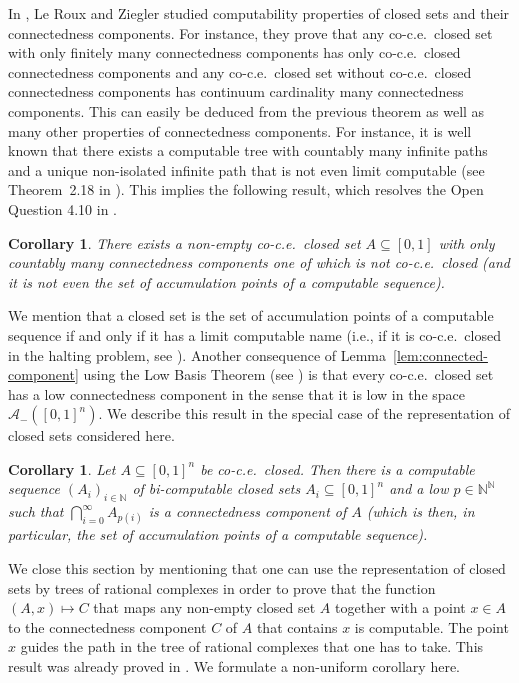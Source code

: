 \documentclass[a4paper]{amsart}
\def\AA{{\mathcal A}}
\def\IN{{\mathbb{N}}}
\def\In{\subseteq}
\newtheorem{corollary}[theorem]{Corollary}
\theoremstyle{definition}
\begin{document}
In \cite{LZ08a}, Le Roux and Ziegler studied computability properties of closed sets and their connectedness components.
For instance, they prove that any co-c.e.\ closed set with only finitely many connectedness components has only co-c.e.\ closed
connectedness components and any co-c.e.\ closed set without co-c.e.\ closed connectedness components has continuum cardinality
many connectedness components. This can easily be deduced from the previous theorem as well as many other properties of connectedness components.
For instance, it is well known that there exists a computable tree with countably many infinite paths and a unique non-isolated infinite path that is
not even limit computable (see Theorem~2.18 in \cite{CDJS93}).
This implies the following result, which resolves the Open Question 4.10 in \cite{LZ08a}.

\begin{corollary}
There exists a non-empty co-c.e.\ closed set $A\In[0,1]$ with only countably many connectedness components
one of which is not co-c.e.\ closed (and it is not even the set of accumulation points of a computable sequence).
\end{corollary}

We mention that a closed set is the set of accumulation points of a computable sequence if and only if it has a limit
computable name (i.e., if it is co-c.e.\ closed in the halting problem, see \cite{LZ08a,BGM12}).
Another consequence of Lemma~\ref{lem:connected-component} using the Low Basis Theorem (see \cite{Soa87}) 
is that every co-c.e.\ closed set has a low connectedness component in the sense that it is low in the space $\AA_-([0,1]^n)$.
We describe this result in the special case of the representation of closed sets considered here.

\begin{corollary}
Let $A\In[0,1]^n$ be co-c.e.\ closed. Then there is a computable sequence $(A_i)_{i\in\IN}$ of bi-computable closed
sets $A_i\In[0,1]^n$ and a low $p\in\IN^\IN$ such that
$\bigcap_{i=0}^\infty A_{p(i)}$ is a connectedness component of $A$ (which is then, in particular, the set of accumulation 
points of a computable sequence).
\end{corollary}

We close this section by mentioning that one can use the representation of closed sets by trees of rational complexes in
order to prove that the function $(A,x)\mapsto C$ that maps any non-empty closed set $A$ together with a point $x\in A$
to the connectedness component $C$ of $A$ that contains $x$ is computable. The point $x$ guides the path in the
tree of rational complexes that one has to take. This result was already proved in \cite{LZ08a}. We formulate
a non-uniform corollary here.
\end{document}
